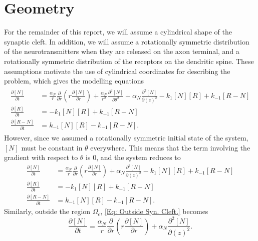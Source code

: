\documentclass{article}
\begin{document}
\section{Geometry}\label{Section: Geometry}
For the remainder of this report, we will assume a cylindrical shape of the synaptic cleft. In addition, we will assume a rotationally symmetric distribution of the neurotransmitters when they are released on the axon terminal, and a rotationally symmetric distribution of the receptors on the dendritic spine. These assumptions motivate the use of cylindrical coordinates for describing the problem, which gives the modelling equations
\begin{align*}
\begin{split}
\frac{\partial [N]}{\partial t} &= \frac{\alpha_N}{r} \frac{\partial}{\partial r} \left(r \frac{\partial [N]}{\partial r} \right) + \frac{\alpha_N}{r^2} \frac{\partial^2 [N]}{\partial \theta^2} + \alpha_N \frac{\partial^2 [N]}{\partial (z)^2} - k_{1}[N] [R] + k_{-1}[R-N]\\
\frac{\partial [R]}{\partial t} &= - k_1[N][R] + k_{-1}[R-N]\\
\frac{\partial [R-N]}{\partial t} &= k_{-1}[N][R] - k_{-1}[R-N].
\end{split}
\end{align*}
However, since we assumed a rotationally symmetric initial state of the system, $[N]$ must be constant in $\theta$ everywhere. This means that the term involving the gradient with respect to $\theta$ is $0$, and the system reduces to
\begin{align*}
\frac{\partial [N]}{\partial t} &= \frac{\alpha_N}{r} \frac{\partial}{\partial r} \left(r \frac{\partial [N]}{\partial r} \right) + \alpha_N \frac{\partial^2 [N]}{\partial (z)^2} - k_{1}[N] [R] + k_{-1}[R-N]\\
\frac{\partial [R]}{\partial t} &= - k_1[N][R] + k_{-1}[R-N]\\
\frac{\partial [R-N]}{\partial t} &= k_{-1}[N][R] - k_{-1}[R-N].
\end{align*}
Similarly, outside the region $\Omega_\epsilon$, \eqref{Eq: Outside Syn. Cleft.} becomes \begin{equation*}
    \frac{\partial [N]}{\partial t} = \frac{\alpha_N}{r} \frac{\partial}{\partial r} \left(r \frac{\partial [N]}{\partial r} \right) + \alpha_N \frac{\partial^2 [N]}{\partial (z)^2}.
\end{equation*}
\end{document}
